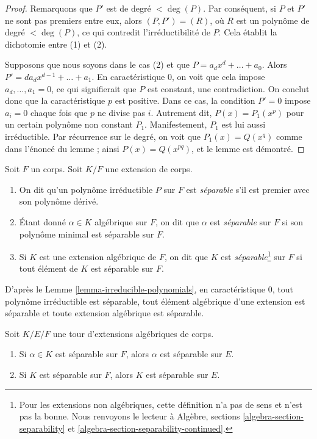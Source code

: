 \begin{proof}
Remarquons que $P'$ est de degré $< \deg(P)$. Par conséquent, si $P$ et $P'$ ne sont pas premiers
entre eux, alors $(P, P') = (R)$, où $R$ est un polynôme de degré $< \deg(P)$,
ce qui contredit l'irréductibilité de $P$. Cela établit la dichotomie
entre (1) et (2).

\medskip\noindent
Supposons que nous soyons dans le cas (2) et que $P = a_d x^d + \ldots + a_0$. Alors
$P' = da_d x^{d - 1} + \ldots + a_1$. En caractéristique $0$, on voit
que cela impose $a_d, \ldots, a_1 = 0$, ce qui signifierait que $P$ est constant,
une contradiction. On conclut donc que la caractéristique $p$ est positive.
Dans ce cas, la condition $P' = 0$ impose $a_i = 0$ chaque fois que $p$ ne
divise pas $i$.
Autrement dit, $P(x) = P_1(x^p)$ pour un certain polynôme non constant $P_1$.
Manifestement, $P_1$ est lui aussi irréductible. Par récurrence sur le degré, on
voit que $P_1(x) = Q(x^q)$ comme dans l'énoncé du lemme ; ainsi
$P(x) = Q(x^{pq})$, et le lemme est démontré.
\end{proof}

\begin{definition}
\label{definition-separable}
Soit $F$ un corps. Soit $K/F$ une extension de corps.
\begin{enumerate}
\item On dit qu'un polynôme irréductible $P$ sur $F$ est {\it séparable}
s'il est premier avec son polynôme dérivé.
\item Étant donné $\alpha \in K$ algébrique sur $F$, on dit que $\alpha$ est
{\it séparable} sur $F$ si son polynôme minimal est séparable sur $F$.
\item Si $K$ est une extension algébrique de $F$, on dit que $K$ est
{\it séparable}\footnote{Pour les extensions non algébriques,
cette définition n'a pas de sens et n'est pas la bonne. Nous renvoyons
le lecteur à Algèbre, sections \ref{algebra-section-separability} et
\ref{algebra-section-separability-continued}.}
sur $F$ si tout élément de $K$ est séparable sur $F$.
\end{enumerate}
\end{definition}

\noindent
D'après le Lemme \ref{lemma-irreducible-polynomials}, en caractéristique $0$, tout
polynôme irréductible est séparable, tout élément algébrique d'une extension
est séparable et toute extension algébrique est séparable.

\begin{lemma}
\label{lemma-separable-goes-up}
Soit $K/E/F$ une tour d'extensions algébriques de corps.
\begin{enumerate}
\item Si $\alpha \in K$ est séparable sur $F$, alors $\alpha$ est séparable
sur $E$.
\item Si $K$ est séparable sur $F$, alors $K$ est séparable sur $E$.
\end{enumerate}
\end{lemma}


